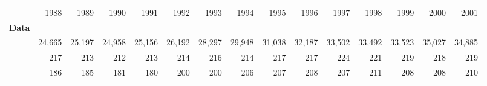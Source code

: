 \begin{tabular}{lllllllllllllll}
\cline{1-15}
\multicolumn{1}{c}{} &
  \multicolumn{1}{|r}{1988} &
  \multicolumn{1}{r}{1989} &
  \multicolumn{1}{r}{1990} &
  \multicolumn{1}{r}{1991} &
  \multicolumn{1}{r}{1992} &
  \multicolumn{1}{r}{1993} &
  \multicolumn{1}{r}{1994} &
  \multicolumn{1}{r}{1995} &
  \multicolumn{1}{r}{1996} &
  \multicolumn{1}{r}{1997} &
  \multicolumn{1}{r}{1998} &
  \multicolumn{1}{r}{1999} &
  \multicolumn{1}{r}{2000} &
  \multicolumn{1}{r}{2001} \\
\cline{1-15}
\multicolumn{1}{l}{\textbf{Data}} &
  \multicolumn{1}{|r}{} &
  \multicolumn{1}{r}{} &
  \multicolumn{1}{r}{} &
  \multicolumn{1}{r}{} &
  \multicolumn{1}{r}{} &
  \multicolumn{1}{r}{} &
  \multicolumn{1}{r}{} &
  \multicolumn{1}{r}{} &
  \multicolumn{1}{r}{} &
  \multicolumn{1}{r}{} &
  \multicolumn{1}{r}{} &
  \multicolumn{1}{r}{} &
  \multicolumn{1}{r}{} &
  \multicolumn{1}{r}{} \\
\multicolumn{1}{l}{\hspace{1em}{$\#$ obs.}} &
  \multicolumn{1}{|r}{24,665} &
  \multicolumn{1}{r}{25,197} &
  \multicolumn{1}{r}{24,958} &
  \multicolumn{1}{r}{25,156} &
  \multicolumn{1}{r}{26,192} &
  \multicolumn{1}{r}{28,297} &
  \multicolumn{1}{r}{29,948} &
  \multicolumn{1}{r}{31,038} &
  \multicolumn{1}{r}{32,187} &
  \multicolumn{1}{r}{33,502} &
  \multicolumn{1}{r}{33,492} &
  \multicolumn{1}{r}{33,523} &
  \multicolumn{1}{r}{35,027} &
  \multicolumn{1}{r}{34,885} \\
\multicolumn{1}{l}{\hspace{1em}{$\#$ sectors}} &
  \multicolumn{1}{|r}{217} &
  \multicolumn{1}{r}{213} &
  \multicolumn{1}{r}{212} &
  \multicolumn{1}{r}{213} &
  \multicolumn{1}{r}{214} &
  \multicolumn{1}{r}{216} &
  \multicolumn{1}{r}{214} &
  \multicolumn{1}{r}{217} &
  \multicolumn{1}{r}{217} &
  \multicolumn{1}{r}{224} &
  \multicolumn{1}{r}{221} &
  \multicolumn{1}{r}{219} &
  \multicolumn{1}{r}{218} &
  \multicolumn{1}{r}{219} \\
\multicolumn{1}{l}{\hspace{1em}{$\#$ origin countries}} &
  \multicolumn{1}{|r}{186} &
  \multicolumn{1}{r}{185} &
  \multicolumn{1}{r}{181} &
  \multicolumn{1}{r}{180} &
  \multicolumn{1}{r}{200} &
  \multicolumn{1}{r}{200} &
  \multicolumn{1}{r}{206} &
  \multicolumn{1}{r}{207} &
  \multicolumn{1}{r}{208} &
  \multicolumn{1}{r}{207} &
  \multicolumn{1}{r}{211} &
  \multicolumn{1}{r}{208} &
  \multicolumn{1}{r}{208} &
  \multicolumn{1}{r}{210} \\

\end{tabular}

